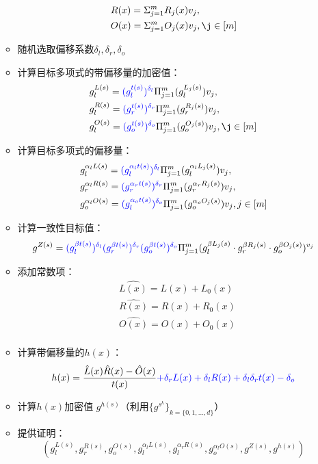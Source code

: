 \documentclass[12pt]{article}
\begin{document}
\begin{itemize}
\begin{itemize}
\begin{align*}
		& R(x)= \Sigma_{j=1}^m R_j(x)v_j,\\
		& O(x)= \Sigma_{j=1}^m O_j(x)v_j, \j \in [m]
		\end{align*}
		\item 随机选取偏移系数$\delta_l,\delta_r,\delta_o$
		\item 计算目标多项式的{\color{blue}带偏移量的}加密值：
		\begin{align*}
		&g_l^{L(s)}= {\color{blue}(g_l^{t(s)})^{\delta_l}}\Pi_{j=1}^m (g_l^{L_j(s)}){v_j},\\
		&  g_l^{R(s)}= {\color{blue}(g_r^{t(s)})^{\delta_r}}\Pi_{j=1}^m (g_r^{R_j(s)}){v_j},\\
		&  g_l^{O(s)}= {\color{blue}(g_o^{t(s)})^{\delta_o}}\Pi_{j=1}^m (g_o^{O_j(s)}){v_j}, \j \in [m]
		\end{align*}
		\item 计算目标多项式的偏移量：
		\begin{align*}
		&g_l^{\alpha_l L(s)}= {\color{blue}(g_l^{\alpha_l t(s)})^{\delta_l}}\Pi_{j=1}^m (g_l^{\alpha_l L_j(s)}){v_j},\\
		&g_r^{\alpha_l R(s)}= {\color{blue}(g_r^{\alpha_r t(s)})^{\delta_r}}\Pi_{j=1}^m (g_r^{\alpha_r R_j(s)}){v_j},\\
		&g_o^{\alpha_l O(s)}= {\color{blue}(g_l^{\alpha_o t(s)})^{\delta_o}}\Pi_{j=1}^m (g_o^{\alpha_o O_j(s)}){v_j}, j \in [m]
		\end{align*}
		\item 计算一致性目标值：
		$$g^{Z(s)} ={\color{blue} (g_l^{\beta t(s)})^{\delta_l} (g_r^{\beta t(s)})^{\delta_r}(g_o^{\beta t(s)})^{\delta_o}}\Pi_{j=1}^m (g_l^{\beta L_j(s)}\cdot g_r^{\beta R_j(s)}\cdot g_o^{\beta O_j(s)})^{v_j}$$
		\item 添加常数项：
		\begin{align*}
		& \hat{L(x)}=  L(x)+L_0(x)\\
		& \hat{R(x)}=  R(x)+R_0(x)\\
		& \hat{O(x)}=  O(x)+O_0(x)\\
		\end{align*}
		\item 计算{\color{blue}带偏移量的}$h(x)$：
		$$ h(x) = \frac{\hat{L}(x)\hat{R}(x)-\hat{O}(x)}{t(x)}{\color{blue}+\delta_r L(x)+\delta_l 	R(x)+\delta_l\delta_r t(x)-\delta_o }$$
		\item 计算$h(x)$加密值	$g^{h(s)}$（利用$\{g^{s^k}\}_{k=\{0,1,...,d\}}$）
		\item 提供证明：
		$$ (g_l^{L(s)},g_r^{R(s)},g_o^{O(s)}, g_l^{\alpha_l L(s)},g_l^{\alpha_r R(s)},g_o^{\alpha_l O(s)},g^{Z(s)},g^{h(s)})$$

\end{itemize}
\end{itemize}
\end{document}
